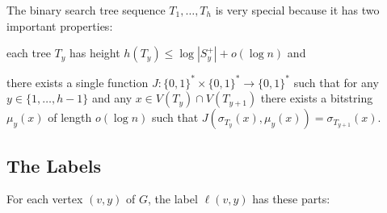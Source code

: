 \documentclass{patmorin}
\begin{document}
The binary search tree sequence $T_1,\ldots,T_h$ is very special because it has two important properties:
\begin{inparaenum}[(i)]
    \item each tree $T_y$ has height $h(T_y)\le \log|S^+_y|+o(\log n)$ and
    \item there exists a single function $J:\{0,1\}^*\times\{0,1\}^*\to\{0,1\}^*$ such that for any $y\in\{1,\ldots,h-1\}$ and any $x\in V(T_y)\cap V(T_{y+1})$ there exists a bitstring $\mu_y(x)$ of length $o(\log n)$ such that $J(\sigma_{T_y}(x),\mu_y(x))=\sigma_{T_{y+1}}(x)$.
\end{inparaenum}




\subsection{The Labels}
\label{labels-i}

For each vertex $(v,y)$ of $G$, the label $\ell(v,y)$ has these parts:
\end{document}
